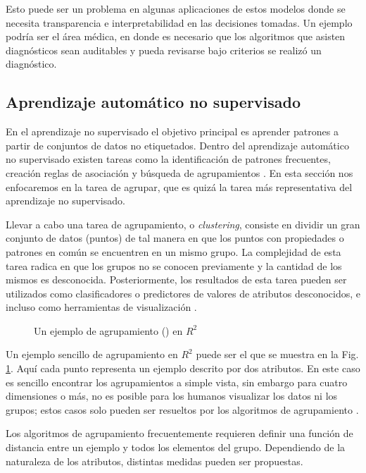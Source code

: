 Esto puede ser un problema en algunas aplicaciones de estos modelos donde se necesita transparencia e interpretabilidad en las decisiones tomadas. Un ejemplo podría ser el área médica, en donde es necesario que los algoritmos que asisten diagnósticos sean auditables y pueda revisarse bajo criterios se realizó un diagnóstico.

\subsection{Aprendizaje automático no supervisado}

En el aprendizaje no supervisado el objetivo principal es aprender patrones a partir de conjuntos de datos no etiquetados. Dentro del aprendizaje automático no supervisado existen tareas como la identificación de patrones frecuentes, creación reglas de asociación y búsqueda de agrupamientos \cite{kubat_introduction_2017}. En esta sección nos enfocaremos en la tarea de agrupar, que es quizá la tarea más representativa del aprendizaje no supervisado. 

Llevar a cabo una tarea de agrupamiento, o \textit{clustering}, consiste en dividir un gran conjunto de datos (puntos) de tal manera en que los puntos con propiedades o patrones en común se encuentren en un mismo grupo. La complejidad de esta tarea radica en que los grupos no se conocen previamente y la cantidad de los mismos es desconocida. Posteriormente, los resultados de esta tarea pueden ser utilizados como clasificadores o predictores de valores de atributos desconocidos, e incluso como herramientas de visualización \cite{kubat_introduction_2017}.

 \begin{figure}[htbp]
   \centering
   
    \caption{Un ejemplo de agrupamiento () en $R^2$}
    \label{fig:clustering-example}
\end{figure}

Un ejemplo sencillo de agrupamiento en $R^2$ puede ser el que se muestra en la Fig. \ref{fig:clustering-example}. Aquí cada punto representa un ejemplo descrito por dos atributos. En este caso es sencillo encontrar los agrupamientos a simple vista, sin embargo para cuatro dimensiones o más, no es posible para los humanos visualizar los datos ni los grupos; estos casos solo pueden ser resueltos por los algoritmos de agrupamiento \cite{kubat_introduction_2017}.

Los algoritmos de agrupamiento frecuentemente requieren definir una función de distancia entre un ejemplo y todos los elementos del grupo. Dependiendo de la naturaleza de los atributos, distintas medidas pueden ser propuestas. 

